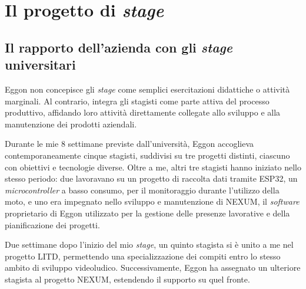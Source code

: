 \chapter{Il progetto di \textit{stage}}

\section{Il rapporto dell'azienda con gli \textit{stage} universitari}
\label{sec:rapporto-eggon-stage}


Eggon non concepisce gli \textit{stage} come semplici esercitazioni didattiche o attività marginali. Al contrario, integra gli stagisti come parte attiva del processo produttivo, affidando loro attività direttamente collegate allo sviluppo e alla manutenzione dei prodotti aziendali.

Durante le mie 8 settimane previste dall'università, Eggon accoglieva contemporaneamente cinque stagisti, suddivisi su tre progetti distinti, ciascuno con obiettivi e tecnologie diverse. Oltre a me, altri tre stagisti hanno iniziato nello stesso periodo: due lavoravano su un progetto di raccolta dati tramite ESP32, un \textit{microcontroller} a basso consumo, per il monitoraggio durante l'utilizzo della moto, e uno era impegnato nello sviluppo e manutenzione di NEXUM, il \textit{software} proprietario di Eggon utilizzato per la gestione delle presenze lavorative e della pianificazione dei progetti.

Due settimane dopo l'inizio del mio \textit{stage}, un quinto stagista si è unito a me nel progetto LITD, permettendo una specializzazione dei compiti entro lo stesso ambito di sviluppo videoludico. Successivamente, Eggon ha assegnato un ulteriore stagista al progetto NEXUM, estendendo il supporto su quel fronte.

